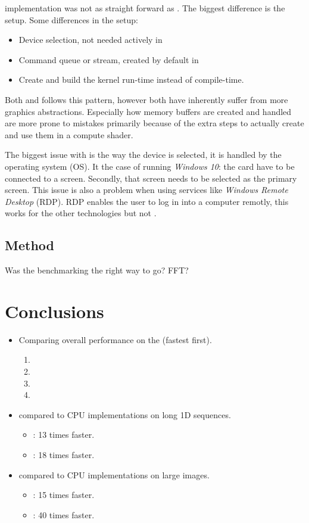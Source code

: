 {\OCL} implementation was not as straight forward as {\CU}. The biggest difference is the setup. Some differences in the setup:
\begin{itemize}
	\item Device selection, not needed actively in {\CU}
	\item Command queue or stream, created by default in {\CU}
	\item Create and build the kernel run-time instead of compile-time.
\end{itemize}
Both {\DX} and {\GL} follows this pattern, however both have inherently suffer from more graphics abstractions. Especially how memory buffers are created and handled are more prone to mistakes primarily because of the extra steps to actually create and use them in a compute shader.

The biggest issue with {\GL} is the way the device is selected, it is handled by the operating system (OS). It the case of running \textit{Windows 10}: the card have to be connected to a screen. Secondly, that screen needs to be selected as the primary screen. This issue is also a problem when using services like \textit{Windows Remote Desktop} (RDP). RDP enables the user to log in into a computer remotly, this works for the other technologies but not {\GL}.

\subsection{Method}

Was the benchmarking the right way to go? FFT?

\section{Conclusions}

\begin{itemize}
	\item Comparing overall performance on the {\NVCARD} (fastest first).
	\begin{enumerate}	
		\item {\CU}
		\item {\DX}
		\item {\GL}
		\item {\OCL}
	\end{enumerate}
	\item {\CU} compared to CPU implementations on long 1D sequences.
	\begin{itemize}
		\item {\OMP}: 13 times faster.
		\item {\CPP}: 18 times faster.
	\end{itemize}
	\item {\CU} compared to CPU implementations on large images.
	\begin{itemize}
		\item {\OMP}: 15 times faster.
		\item {\CPP}: 40 times faster.
	\end{itemize}
\end{itemize}

